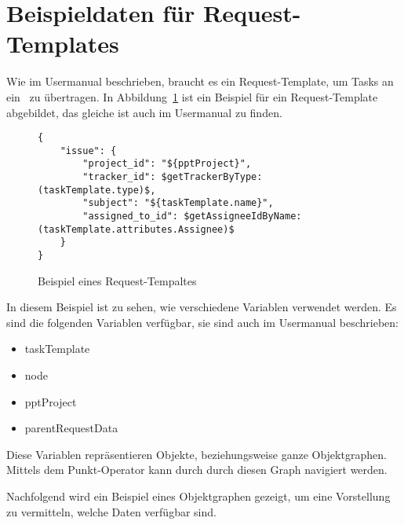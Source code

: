 

\section{Beispieldaten für Request-Templates}
	Wie im Usermanual beschrieben, braucht es ein Request-Template, um Tasks an ein \ppt\ zu übertragen.
	In Abbildung~\ref{fig:exampleRequestTemplate} ist ein Beispiel für ein Request-Template abgebildet, das gleiche ist auch im Usermanual zu finden.
	
	\begin{figure}[H]
		\begin{lstlisting}
{
	"issue": {
		"project_id": "${pptProject}",
		"tracker_id": $getTrackerByType:(taskTemplate.type)$,
		"subject": "${taskTemplate.name}",
		"assigned_to_id": $getAssigneeIdByName:(taskTemplate.attributes.Assignee)$
	}
}

		\end{lstlisting}
		\centering
		\caption{Beispiel eines Request-Tempaltes}
		\label{fig:exampleRequestTemplate}
	\end{figure}	
	
	In diesem Beispiel ist zu sehen, wie verschiedene Variablen verwendet werden.
	Es sind die folgenden Variablen verfügbar, sie sind auch im Usermanual beschrieben:
	\begin{itemize}
		\item taskTemplate
		\item node
		\item pptProject
		\item parentRequestData
	\end{itemize}
	Diese Variablen repräsentieren Objekte, beziehungsweise ganze Objektgraphen.
	Mittels dem Punkt-Operator kann durch durch diesen Graph navigiert werden.
	
	Nachfolgend wird ein Beispiel eines Objektgraphen gezeigt,
	um eine Vorstellung zu vermitteln, welche Daten verfügbar sind.

	
